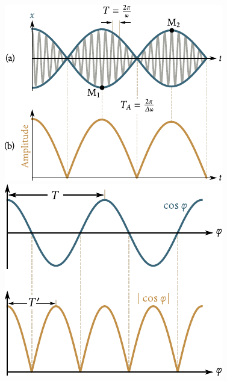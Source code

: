 \begin{figure}[t]
	\begin{minipage}[t]{0.5\linewidth}
		\begin{center}
			\includegraphics[scale=1.0]{figures/ch_07/fig_7_11.pdf}
			\caption[]{}
			\label{fig:7_11}
		\end{center}
	\end{minipage}
	\hspace{-0.0cm}
	\begin{minipage}[t]{0.5\linewidth}
		\begin{center}
			\includegraphics[scale=0.85]{figures/ch_07/fig_7_12.pdf}
			\caption[]{}
			\label{fig:7_12}
		\end{center}
	\end{minipage}
	\vspace{-0.2cm}
\end{figure}

